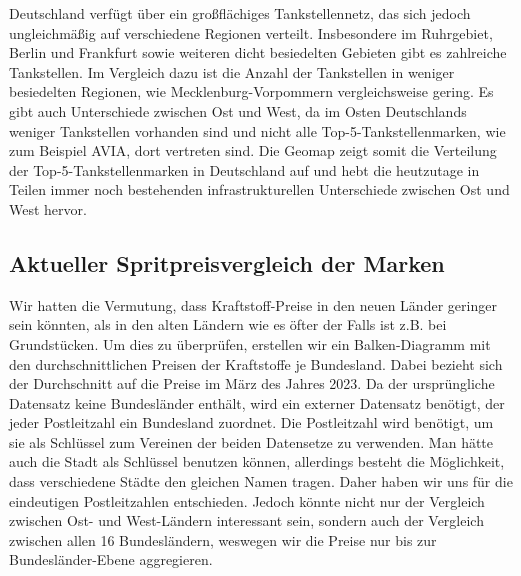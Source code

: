 \documentclass[11pt]{article}
\begin{document}
    Deutschland verfügt über ein großflächiges Tankstellennetz, das sich
jedoch ungleichmäßig auf verschiedene Regionen verteilt. Insbesondere im
Ruhrgebiet, Berlin und Frankfurt sowie weiteren dicht besiedelten
Gebieten gibt es zahlreiche Tankstellen. Im Vergleich dazu ist die
Anzahl der Tankstellen in weniger besiedelten Regionen, wie
Mecklenburg-Vorpommern vergleichsweise gering. Es gibt auch Unterschiede
zwischen Ost und West, da im Osten Deutschlands weniger Tankstellen
vorhanden sind und nicht alle Top-5-Tankstellenmarken, wie zum Beispiel
AVIA, dort vertreten sind. Die Geomap zeigt somit die Verteilung der
Top-5-Tankstellenmarken in Deutschland auf und hebt die heutzutage in
Teilen immer noch bestehenden infrastrukturellen Unterschiede zwischen
Ost und West hervor.

\begin{center}
\hspace{-2cm}
    \end{center}    




    \hypertarget{aktueller-spritpreisvergleich-der-marken}{%
\subsection{Aktueller Spritpreisvergleich der
Marken}\label{aktueller-spritpreisvergleich-der-marken}}

    Wir hatten die Vermutung, dass Kraftstoff-Preise in den neuen Länder
geringer sein könnten, als in den alten Ländern wie es öfter der Falls
ist z.B. bei Grundstücken. Um dies zu überprüfen, erstellen wir ein
Balken-Diagramm mit den durchschnittlichen Preisen der Kraftstoffe je
Bundesland. Dabei bezieht sich der Durchschnitt auf die Preise im März
des Jahres 2023. Da der ursprüngliche Datensatz keine Bundesländer
enthält, wird ein externer Datensatz benötigt, der jeder Postleitzahl
ein Bundesland zuordnet. Die Postleitzahl wird benötigt, um sie als
Schlüssel zum Vereinen der beiden Datensetze zu verwenden. Man hätte
auch die Stadt als Schlüssel benutzen können, allerdings besteht die
Möglichkeit, dass verschiedene Städte den gleichen Namen tragen. Daher
haben wir uns für die eindeutigen Postleitzahlen entschieden. Jedoch
könnte nicht nur der Vergleich zwischen Ost- und West-Ländern
interessant sein, sondern auch der Vergleich zwischen allen 16
Bundesländern, weswegen wir die Preise nur bis zur Bundesländer-Ebene
aggregieren.
\end{document}
